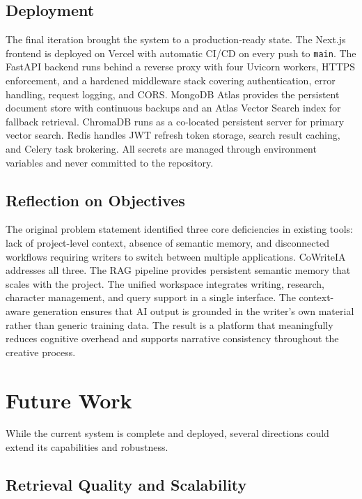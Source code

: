 \subsection{Deployment}

The final iteration brought the system to a production-ready state. The Next.js frontend is deployed on Vercel with automatic CI/CD on every push to \texttt{main}. The FastAPI backend runs behind a reverse proxy with four Uvicorn workers, HTTPS enforcement, and a hardened middleware stack covering authentication, error handling, request logging, and CORS. MongoDB Atlas provides the persistent document store with continuous backups and an Atlas Vector Search index for fallback retrieval. ChromaDB runs as a co-located persistent server for primary vector search. Redis handles JWT refresh token storage, search result caching, and Celery task brokering. All secrets are managed through environment variables and never committed to the repository.

\subsection{Reflection on Objectives}

The original problem statement identified three core deficiencies in existing tools: lack of project-level context, absence of semantic memory, and disconnected workflows requiring writers to switch between multiple applications. CoWriteIA addresses all three. The RAG pipeline provides persistent semantic memory that scales with the project. The unified workspace integrates writing, research, character management, and query support in a single interface. The context-aware generation ensures that AI output is grounded in the writer's own material rather than generic training data. The result is a platform that meaningfully reduces cognitive overhead and supports narrative consistency throughout the creative process.

\section{Future Work}
\label{sec:future-work}

While the current system is complete and deployed, several directions could extend its capabilities and robustness.

\subsection{Retrieval Quality and Scalability}

